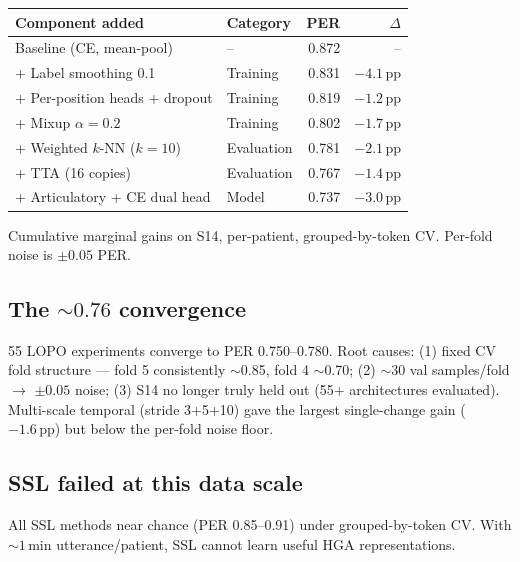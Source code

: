 \documentclass[11pt,letterpaper]{article}
\newcommand{\pp}{\,\text{pp}}
\begin{document}
\begin{table}[ht!]
\centering\small
\begin{tabular}{@{}llrr@{}}
\toprule
\textbf{Component added} & \textbf{Category} & \textbf{PER} & \textbf{$\Delta$} \\
\midrule
Baseline (CE, mean-pool) & -- & 0.872 & -- \\
+ Label smoothing 0.1 & Training & 0.831 & $-4.1\pp$ \\
+ Per-position heads + dropout & Training & 0.819 & $-1.2\pp$ \\
+ Mixup $\alpha{=}0.2$ & Training & 0.802 & $-1.7\pp$ \\
+ Weighted $k$-NN ($k{=}10$) & Evaluation & 0.781 & $-2.1\pp$ \\
+ TTA (16 copies) & Evaluation & 0.767 & $-1.4\pp$ \\
+ Articulatory + CE dual head & Model & 0.737 & $-3.0\pp$ \\
\bottomrule
\end{tabular}
\end{table}

Cumulative marginal gains on S14, per-patient, grouped-by-token CV. Per-fold noise is $\pm 0.05$ PER.

\subsection{The ${\sim}0.76$ convergence}

55 LOPO experiments converge to PER 0.750--0.780. Root causes: (1) fixed CV fold structure --- fold 5 consistently ${\sim}$0.85, fold 4 ${\sim}$0.70; (2) ${\sim}$30 val samples/fold $\to$ $\pm 0.05$ noise; (3) S14 no longer truly held out (55+ architectures evaluated). Multi-scale temporal (stride 3+5+10) gave the largest single-change gain ($-1.6\pp$) but below the per-fold noise floor.

\subsection{SSL failed at this data scale}

All SSL methods near chance (PER 0.85--0.91) under grouped-by-token CV. With ${\sim}1$\,min utterance/patient, SSL cannot learn useful HGA representations.


\end{document}
